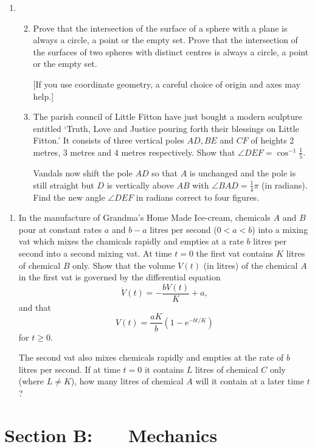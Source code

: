 \documentclass[a4, 11pt]{report}
\newlength{\qspace}
\newcounter{qnumber}
\newenvironment{question}%
 {\vspace{\qspace}
  \begin{enumerate}[\bfseries 1\quad][10]%
    \setcounter{enumi}{\value{qnumber}}%
    \item%
 }
{
  \end{enumerate}
  \filbreak
  \stepcounter{qnumber}
 }
\newenvironment{questionparts}[1][1]%
 {
  \begin{enumerate}[\bfseries (i)]%
    \setcounter{enumii}{#1}
    \addtocounter{enumii}{-1}
    \setlength{\itemsep}{5mm}
    \setlength{\parskip}{8pt}
 }
 {
  \end{enumerate}
 }
\begin{document}
\begin{question}	
\begin{questionparts}
\item Prove that the intersection of the surface
of a sphere with a plane is always a circle, a point or the empty
set. Prove that the intersection of the surfaces of two spheres with
distinct centres is always a circle, a point or the empty set. 


{[}If you use coordinate geometry, a careful choice of origin and
axes may help.{]} 


\item The parish council of Little Fitton have just bought a modern
sculpture entitled `Truth, Love and Justice pouring forth their blessings
on Little Fitton.' It consists of three vertical poles $AD,BE$ and
$CF$ of heights 2 metres, 3 metres and 4 metres respectively. Show
that $\angle DEF=\cos^{-1}\frac{1}{5}.$


Vandals now shift the pole $AD$ so that $A$ is unchanged and the
pole is still straight but $D$ is vertically above $AB$ with $\angle BAD=\frac{1}{4}\pi$
(in radians). Find the new angle $\angle DEF$ in radians correct
to four figures. 
\end{questionparts}
\end{question}	
		
\begin{question}
In the manufacture of Grandma's Home Made Ice-cream, chemicals $A$
and $B$ pour at constant rates $a$ and $b-a$ litres per second
($0<a<b$) into a mixing vat which mixes the chamicals rapidly and
empties at a rate $b$ litres per second into a second mixing vat.
At time $t=0$ the first vat contains $K$ litres of chemical $B$
only. Show that the volume $V(t)$ (in litres) of the chemical $A$
in the first vat is governed by the differential equation 
\[
\dot{V}(t)=-\frac{bV(t)}{K}+a,
\]
and that 
\[
V(t)=\frac{aK}{b}(1-\mathrm{e}^{-bt/K})
\]
for $t\geqslant0.$


The second vat also mixes chemicals rapidly and empties at the rate
of $b$ litres per second. If at time $t=0$ it contains $L$ litres
of chemical $C$ only (where $L\neq K$), how many litres of chemical
$A$ will it contain at a later time $t$? 
\end{question}
			
		
			

		
	
\newpage
\section*{Section B: \ \ \ Mechanics}
\end{document}
